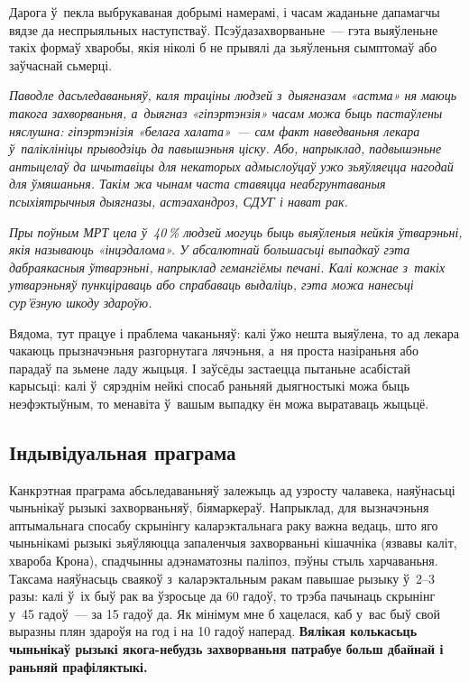 Дарога ў~пекла выбрукаваная добрымі намерамі, і часам жаданьне дапамагчы вядзе да неспрыяльных наступстваў. Псэўдазахворваньне~--- гэта выяўленьне такіх формаў хваробы, якія ніколі б не прывялі да зьяўленьня сымптомаў або заўчаснай сьмерці.

\emph{Паводле дасьледаваньняў, каля траціны людзей з~дыягназам «астма» ня маюць такога захворваньня, а~дыягназ «гіпэртэнзія» часам можа быць пастаўлены няслушна: гіпэртэнізія «белага халата»~--- сам факт наведваньня лекара ў~паліклініцы прыводзіць да павышэньня ціску. Або, напрыклад, падвышэньне антыцелаў да шчытавіцы для некаторых адмыслоўцаў ужо зьяўляецца нагодай для ўмяшаньня. Такім жа чынам часта ставяцца неабгрунтаваныя псыхіятрычныя дыягназы, астэахандроз, СДУГ і нават рак.}

\emph{Пры поўным МРТ цела ў~40\,\% людзей могуць быць выяўленыя нейкія ўтварэньні, якія называюць «інцэдалома». У абсалютнай большасьці выпадкаў гэта дабраякасныя ўтварэньні, напрыклад гемангіёмы печані. Калі кожнае з~такіх утварэньняў пункціраваць або спрабаваць выдаліць, гэта можа нанесьці сур'ёзную шкоду здароўю.}

Вядома, тут працуе і праблема чаканьняў: калі ўжо нешта выяўлена, то ад лекара чакаюць прызначэньня разгорнутага лячэньня, а~ня проста назіраньня або парадаў па зьмене ладу жыцьця. І заўсёды застаецца пытаньне асабістай карысьці: калі ў~сярэднім нейкі спосаб раньняй дыягностыкі можа быць неэфэктыўным, то менавіта ў~вашым выпадку ён можа выратаваць жыцьцё.

\subsection*{Індывідуальная праграма}

Канкрэтная праграма абсьледаваньняў залежыць ад узросту чалавека, наяўнасьці чыньнікаў рызыкі захворваньняў, біямаркераў. Напрыклад, для вызначэньня аптымальнага спосабу скрынінгу каларэктальнага раку важна ведаць, што яго чыньнікамі рызыкі зьяўляюцца запаленчыя захворваньні кішачніка (язвавы каліт, хвароба Крона), спадчынны адэнаматозны паліпоз, пэўны стыль харчаваньня. Таксама наяўнасьць сваякоў з~каларэктальным ракам павышае рызыку ў~2--3 разы: калі ў~іх быў рак ва ўзросьце да 60 гадоў, то трэба пачынаць скрынінг у~45 гадоў~--- за 15 гадоў да. Як мінімум мне б хацелася, каб у~вас быў свой выразны плян здароўя на год і на 10 гадоў наперад. \textbf{Вялікая колькасьць чыньнікаў рызыкі якога-небудзь захворваньня патрабуе больш дбайнай і раньняй прафіляктыкі.}

